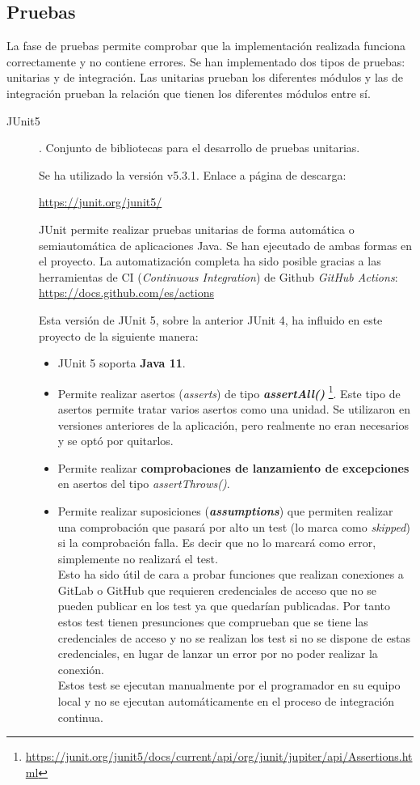 \subsection{Pruebas}
La fase de pruebas permite comprobar que la implementación realizada funciona correctamente y no contiene errores. Se han implementado dos tipos de pruebas: unitarias y de integración. Las unitarias prueban los diferentes módulos y las de integración prueban la relación que tienen los diferentes módulos entre sí.
\begin{description}
	\item[JUnit5]. Conjunto de bibliotecas para el desarrollo de pruebas unitarias. 
	
		Se ha utilizado la versión  v5.3.1. Enlace a página de descarga:
		
		\url{https://junit.org/junit5/}
		
		JUnit permite realizar pruebas unitarias de forma automática o semiautomática de aplicaciones Java. Se han ejecutado de ambas formas en el proyecto. La automatización completa ha sido posible gracias a las herramientas de CI (\textit{Continuous Integration}) de Github \textit{GitHub Actions}: 
		\url{https://docs.github.com/es/actions}
		
		Esta versión de JUnit 5, sobre la anterior JUnit 4, ha influido en este proyecto de la siguiente manera:
		\begin{itemize}
			\item JUnit 5 soporta \textbf{Java 11}.
			
			\item Permite realizar asertos (\textit{asserts}) de tipo \textit{\textbf{assertAll()}} \footnote{\url{https://junit.org/junit5/docs/current/api/org/junit/jupiter/api/Assertions.html}}. Este tipo de asertos permite tratar varios asertos como una unidad. Se utilizaron en versiones anteriores de la aplicación, pero realmente no eran necesarios y se optó por quitarlos.
			
			\item Permite realizar \textbf{comprobaciones de lanzamiento de excepciones} en asertos del tipo \textit{assertThrows()}.
			
			\item Permite realizar suposiciones (\textit{\textbf{assumptions}}) que permiten realizar una comprobación que pasará por alto un test (lo marca como \textit{skipped}) si la comprobación falla. Es decir que no lo marcará como error, simplemente no realizará el test. 
			\\Esto ha sido útil de cara a probar funciones que realizan conexiones a GitLab o GitHub que requieren credenciales de acceso que no se pueden publicar en los test ya que quedarían publicadas. Por tanto estos test tienen presunciones que comprueban que se tiene las credenciales de acceso y no se realizan los test si no se dispone de estas credenciales, en lugar de lanzar un error por no poder realizar la conexión.
			\\Estos test se ejecutan manualmente por el programador en su equipo local y no se ejecutan automáticamente en el proceso de integración continua.
			

\end{itemize}
\end{description}
